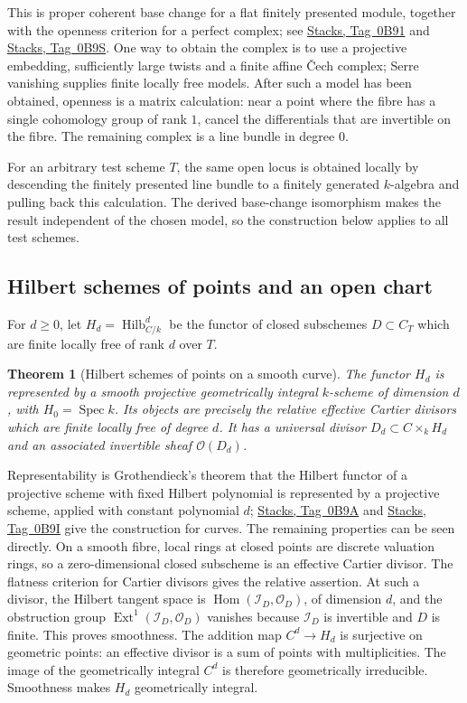 \documentclass[11pt,a4paper]{article}
\numberwithin{equation}{section}
\newtheorem{theorem}{Theorem}[section]
\theoremstyle{definition}
\theoremstyle{remark}
\newcommand{\stacks}[1]{\href{https://stacks.math.columbia.edu/tag/#1}{\textnormal{Stacks, Tag~#1}}}
\newcommand{\Hom}{\operatorname{Hom}}
\newcommand{\Ext}{\operatorname{Ext}}
\begin{document}
This is proper coherent base change for a flat finitely presented
module, together with the openness criterion for a perfect complex;
see \stacks{0B91} and \stacks{0B9S}. One way to obtain the complex is
to use a projective embedding, sufficiently large twists and a finite
affine \v Cech complex; Serre vanishing supplies finite locally free
models. After such a model has been obtained, openness is a matrix
calculation: near a point where the fibre has a single cohomology group
of rank $1$, cancel the differentials that are invertible on the
fibre. The remaining complex is a line bundle in degree $0$.

For an arbitrary test scheme $T$, the same open locus is obtained
locally by descending the finitely presented line bundle to a
finitely generated $k$-algebra and pulling back this calculation.
The derived base-change isomorphism makes the result independent of
the chosen model, so the construction below applies to all test
schemes.

\subsection{Hilbert schemes of points and an open chart}
\label{app:picard-hilbert}

For $d\geq0$, let $H_d=\operatorname{Hilb}^d_{C/k}$ be the functor of
closed subschemes $D\subset C_T$ which are finite locally free of
rank $d$ over $T$.

\begin{theorem}[Hilbert schemes of points on a smooth curve]
\label{app:picard-hilbert-theorem}
The functor $H_d$ is represented by a smooth projective geometrically
integral $k$-scheme of dimension $d$, with $H_0=\operatorname{Spec}k$.
Its objects are precisely the relative effective Cartier divisors
which are finite locally free of degree $d$. It has a universal
divisor $D_d\subset C\times_kH_d$ and an associated invertible sheaf
$\mathcal O(D_d)$.
\end{theorem}

Representability is Grothendieck's theorem that the Hilbert functor of
a projective scheme with fixed Hilbert polynomial is represented by a
projective scheme, applied with constant polynomial $d$;
\stacks{0B9A} and \stacks{0B9I} give the construction for curves. The
remaining properties can be seen directly.
On a smooth fibre, local rings at closed points are discrete valuation
rings, so a zero-dimensional closed subscheme is an effective
Cartier divisor. The flatness criterion for Cartier divisors gives
the relative assertion. At such a divisor, the Hilbert tangent space
is $\Hom(\mathcal I_D,\mathcal O_D)$, of dimension $d$, and the
obstruction group $\Ext^1(\mathcal I_D,\mathcal O_D)$ vanishes because
$\mathcal I_D$ is invertible and $D$ is finite. This proves smoothness.
The addition map $C^d\to H_d$ is surjective on geometric points:
an effective divisor is a sum of points with multiplicities.
The image of the geometrically integral $C^d$ is therefore
geometrically irreducible. Smoothness makes $H_d$ geometrically
integral.
\end{document}
